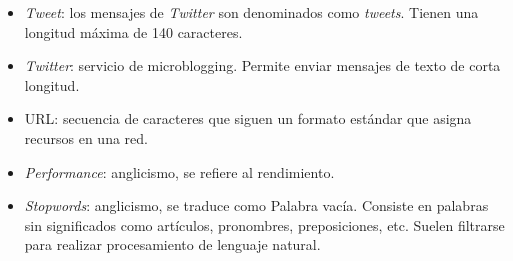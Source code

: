 \begin{glosario}
\begin{itemize}
\item \textit{Tweet}: los mensajes de \textit{Twitter} son denominados como \textit{tweets}. Tienen una longitud máxima de 140 caracteres. 
\item \textit{Twitter}: servicio de microblogging. Permite enviar mensajes de texto de corta longitud.
\item URL: secuencia de caracteres que siguen un formato estándar que asigna recursos en una red.
\item \textit{Performance}: anglicismo, se refiere al rendimiento.
\item \textit{Stopwords}: anglicismo, se traduce como Palabra vacía. Consiste en palabras sin significados como artículos, pronombres, preposiciones, etc. Suelen filtrarse para realizar procesamiento de lenguaje natural.
\end{itemize}

\end{glosario}
